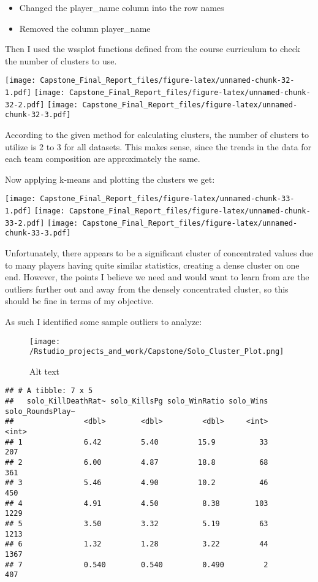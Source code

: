 \documentclass[]{article}
\providecommand{\tightlist}{%
  \setlength{\itemsep}{0pt}\setlength{\parskip}{0pt}}
\begin{document}
\begin{itemize}
\tightlist
\item
  Changed the player\_name column into the row names
\item
  Removed the column player\_name
\end{itemize}

Then I used the wssplot functions defined from the course curriculum to
check the number of clusters to use.

\texttt{[image: Capstone\_Final\_Report\_files/figure-latex/unnamed-chunk-32-1.pdf]}
\texttt{[image: Capstone\_Final\_Report\_files/figure-latex/unnamed-chunk-32-2.pdf]}
\texttt{[image: Capstone\_Final\_Report\_files/figure-latex/unnamed-chunk-32-3.pdf]}

According to the given method for calculating clusters, the number of
clusters to utilize is 2 to 3 for all datasets. This makes sense, since
the trends in the data for each team composition are approximately the
same.

Now applying k-means and plotting the clusters we get:

\texttt{[image: Capstone\_Final\_Report\_files/figure-latex/unnamed-chunk-33-1.pdf]}
\texttt{[image: Capstone\_Final\_Report\_files/figure-latex/unnamed-chunk-33-2.pdf]}
\texttt{[image: Capstone\_Final\_Report\_files/figure-latex/unnamed-chunk-33-3.pdf]}

Unfortunately, there appears to be a significant cluster of concentrated
values due to many players having quite similar statistics, creating a
dense cluster on one end. However, the points I believe we need and
would want to learn from are the outliers further out and away from the
densely concentrated cluster, so this should be fine in terms of my
objective.

As such I identified some sample outliers to analyze:

\begin{figure}
\centering
\texttt{[image: /Rstudio\_projects\_and\_work/Capstone/Solo\_Cluster\_Plot.png]}
\caption{Alt text}
\end{figure}

\begin{verbatim}
## # A tibble: 7 x 5
##   solo_KillDeathRat~ solo_KillsPg solo_WinRatio solo_Wins solo_RoundsPlay~
##                <dbl>        <dbl>         <dbl>     <int>            <int>
## 1              6.42         5.40         15.9          33              207
## 2              6.00         4.87         18.8          68              361
## 3              5.46         4.90         10.2          46              450
## 4              4.91         4.50          8.38        103             1229
## 5              3.50         3.32          5.19         63             1213
## 6              1.32         1.28          3.22         44             1367
## 7              0.540        0.540         0.490         2              407
\end{verbatim}
\end{document}
